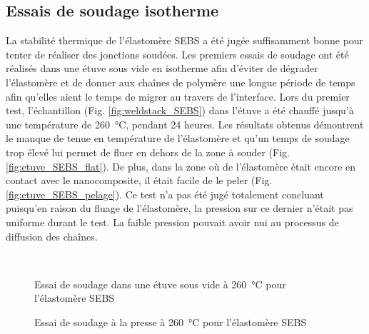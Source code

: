 \FloatBarrier
\subsection{Essais de soudage isotherme}

La stabilité thermique de l'élastomère SEBS a été jugée suffisamment bonne pour tenter de réaliser des jonctions soudées. 
Les premiers essais de soudage ont été réalisés dans une étuve sous vide en isotherme afin d'éviter de dégrader l'élastomère et de donner aux chaînes de polymère une longue période de temps afin qu'elles aient le temps de migrer au travers de l'interface. 
Lors du premier test, l'échantillon (Fig. \ref{fig:weldstack_SEBS}) dans l'étuve a été chauffé jusqu'à une température de \SI{260}{\celsius}, pendant 24 heures. 
Les résultats obtenus démontrent le manque de tenue en température de l'élastomère et qu'un temps de soudage trop élevé lui permet de fluer en dehors de la zone à souder (Fig. \ref{fig:etuve_SEBS_flat}). 
De plus, dans la zone où de l'élastomère était encore en contact avec le nanocomposite, il était facile de le peler (Fig. \ref{fig:etuve_SEBS_pelage}). 
Ce test n'a pas été jugé totalement concluant puisqu'en raison du fluage de l'élastomère, la pression sur ce dernier n'était pas uniforme durant le test. 
La faible pression pouvait avoir nui au processus de diffusion des chaînes. 

\begin{figure}[h!]
	\centering
	 \qquad
	 \\
	\caption{Essai de soudage dans une étuve sous vide à \SI{260}{\celsius} pour l'élastomère SEBS}
	\label{fig:etuve_SEBS}
\end{figure}

\FloatBarrier

\begin{figure}[h]
	\centering
	 \qquad
	\caption{Essai de soudage à la presse à \SI{260}{\celsius} pour l'élastomère SEBS}
	\label{fig:presse_SEBS}
\end{figure}

